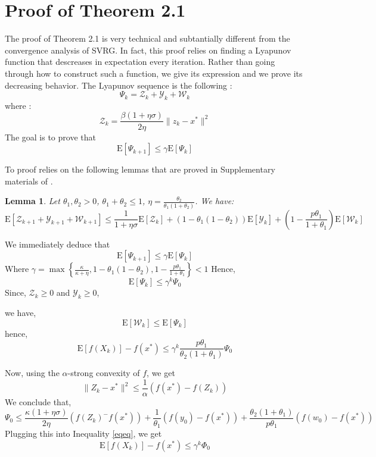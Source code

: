 \documentclass[12pt]{report}
\newtheorem{lemma}{Lemma}[section]
\newcounter{theo}[section]
\newcommand{\E}{\mathrm{E}}
\begin{document}
\section{Proof of Theorem 2.1}
The proof of Theorem 2.1 is very technical and subtantially different from the convergence analysis of SVRG. In fact, this proof relies on finding a Lyapunov function that descreases in expectation every iteration. Rather than going through how to construct such a function, we give its expression and we prove its decreasing behavior.
The Lyapunov sequence is the following : 
$$\Psi_k=\mathcal{Z}_k +\mathcal{Y}_k+\mathcal{W}_k $$
where : 
$$\mathcal{Z}_k=\frac{\beta(1+\eta\sigma)}{2\eta}\|z_k-x^*\|^2$$
The goal is to prove that $$\E[\Psi_{k+1}]\leq \gamma \E[\Psi_{k}] $$

To proof relies on the following lemmas that are proved in Supplementary materials of \cite{kovalev2019don}.
\begin{lemma}
Let $\theta_1,\theta_2>0$, $\theta_1+\theta_2\leq1$, $\eta=\frac{\theta_2}{\theta_1(1+\theta_2)}$.
We have:
\begin{equation}\label{lyapunov}
\E\left[\mathcal{Z}_{k+1}+\mathcal{Y}_{k+1}+\mathcal{W}_{k+1}\right]\leq \frac{1}{1+\eta\sigma}\E\left[\mathcal{Z}_k\right]+(1-\theta_1(1-\theta_2))\E\left[\mathcal{Y}_k\right]+\left(1-\frac{p\theta_1}{1+\theta_1}\right)\E\left[\mathcal{W}_k\right]

\end{equation}
\end{lemma}
We immediately deduce that
$$\E[\Psi_{k+1}]\leq \gamma \E[\Psi_{k}] $$
Where 
$\gamma=\max\left\{\frac{\kappa}{\kappa+\eta},1-\theta_1(1-\theta_2),1-\frac{p\theta_1}{1+\theta_1}\right\}<1$
Hence,
$$\E[\Psi_{k}]\leq \gamma^k \Psi_{0} $$
Since, $\mathcal{Z}_k \geq 0$ and $\mathcal{Y}_k \geq 0$,

we have, $$ \E\left[\mathcal{W}_k\right]\leq \E[\Psi_{k}] $$
hence,
\begin{equation}\label{eqeq}
    \E\left[f(X_k)\right]-f(x^*)\leq \gamma^k\frac{p\theta_1}{\theta_2(1+\theta_1)}\Psi_{0}
\end{equation}

Now, using the $\alpha$-strong convexity of $f$, we get
$$\|{Z}_k-x^*\|^2   \leq \frac{1}{\alpha}\left(f(x^*)-f({Z}_k)\right) $$
We conclude that, 
$$\Psi_0\leq \frac{\kappa(1+\eta\sigma)}{2\eta}\left(f({Z}_k)^-f(x^*)\right)+\frac{1}{\theta_1}(f(y_0)-f(x^*))+\frac{\theta_2(1+\theta_1)}{p\theta_1}(f(w_0)-f(x^*))$$
Plugging this into Inequality \ref{eqeq}, we get
$$\E\left[f(X_k)\right]-f(x^*)\leq \gamma^k\Phi_0 $$
\end{document}
